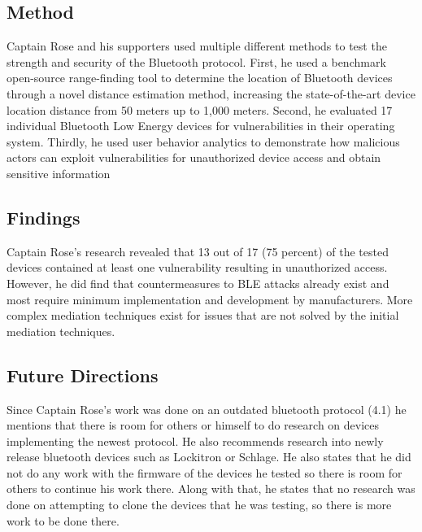 \documentclass[letterpaper,12pt]{article}
\begin{document}
\subsection{Method}

\noindent
Captain Rose and his supporters used multiple different methods to test the strength and security of the Bluetooth protocol. First, he used a benchmark open-source range-finding tool to determine the location of Bluetooth devices through a novel distance estimation method, increasing the state-of-the-art device location distance from 50 meters up to 1,000 meters. Second, he evaluated 17 individual Bluetooth Low Energy devices for vulnerabilities in their operating system. Thirdly, he used user behavior analytics to demonstrate how malicious actors can exploit vulnerabilities for unauthorized device access and obtain sensitive information

\subsection{Findings}

\noindent
Captain Rose's research revealed that 13 out of 17 (75 percent) of the tested devices contained at least one vulnerability resulting in unauthorized access. However, he did find that countermeasures to BLE attacks already exist and most require minimum implementation and development by manufacturers. More complex mediation techniques exist for issues that are not solved by the initial mediation techniques.

\subsection{Future Directions}

\noindent
Since Captain Rose's work was done on an outdated bluetooth protocol (4.1) he mentions that there is room for others or himself to do research on devices implementing the newest protocol. He also recommends research into newly release bluetooth devices such as Lockitron or Schlage. He also states that he did not do any work with the firmware of the devices he tested so there is room for others to continue his work there. Along with that, he states that no research was done on attempting to clone the devices that he was testing, so there is more work to be done there.

\pagebreak


\end{document}
